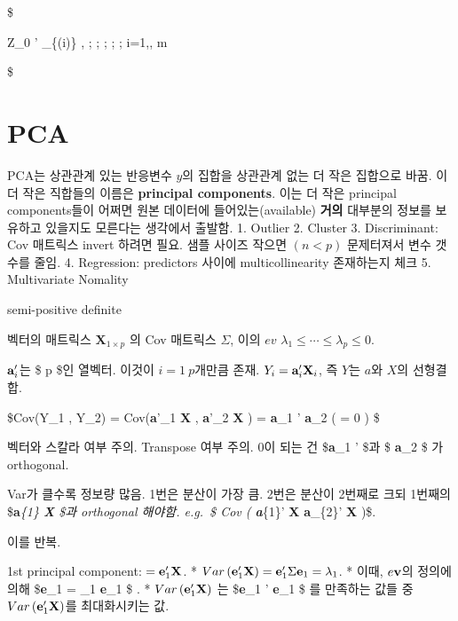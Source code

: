 \documentclass[
]{book}
\begin{document}
{{\$

\pmb Z\_0 ' \pmb \beta\_\{(i)\} \pm {} , ; ; ; ; ; i=1,\cdots, m

\$

\hypertarget{pca}{%
\section{PCA}\label{pca}}

PCA는 상관관계 있는 반응변수 \(y\)의 집합을 상관관계 없는 더 작은 집합으로 바꿈. 이 더 작은 직합들의 이름은 \textbf{principal components}. 이는 더 작은 principal components들이 어쩌면 원본 데이터에 들어있는(available) \textbf{거의} 대부분의 정보를 보유하고 있을지도 모른다는 생각에서 출발함.
1. Outlier
2. Cluster
3. Discriminant: Cov 매트릭스 invert 하려면 필요. 샘플 사이즈 작으면 \((n<p)\) 문제터져서 변수 갯수를 줄임.
4. Regression: predictors 사이에 multicollinearity 존재하는지 체크
5. Multivariate Nomality

semi-positive definite

벡터의 매트릭스 \(\textbf {X}_{1 \times p}\) 의 Cov 매트릭스 \(\Sigma\), 이의 \(ev\) \(\lambda_1 \le \cdots \le \lambda_p \le 0\).

\(\textbf a'_i\)는 \$ p \$인 열벡터. 이것이 \(i=1~p\)개만큼 존재. \(Y_i = \textbf a'_i \textbf {X}_{i}\), 즉 \(Y\)는 \(a\)와 \(X\)의 선형결합.

\$Cov(Y\_1 , Y\_2) = Cov(\textbf a'\_1 \textbf X , \textbf a'\_2 \textbf X ) = \textbf a\_1 ' \Sigma \textbf a\_2 \left( = 0 \right) \$

벡터와 스칼라 여부 주의. Transpose 여부 주의. 0이 되는 건 \$\textbf a\_1 ' \$과 \$ \textbf a\_2 \$ 가 orthogonal.

Var가 클수록 정보량 많음. 1번은 분산이 가장 큼. 2번은 분산이 2번째로 크되 1번째의 \$\textbf {a}\emph{\{1\} \textbf X \$과 orthogonal 해야함. e.g.~\$ Cov \left( \textbf {a}}\{1\}' \textbf X \textbf {a}\_\{2\}' \textbf X \right)\$.

이를 반복.

1st principal component: \(= \textbf e_1 ' \textbf X\).
* \(Var \left( \textbf e_1 ' \textbf X \right)= \textbf e_1 ' \Sigma \textbf e_1 = \lambda_1\).
* 이때, \(e \textbf v\)의 정의에 의해 \$\Sigma \textbf e\_1 = \lambda\_1 \textbf e\_1 \$ .
* \(Var \left( \textbf e_1 ' \textbf X \right)\) 는 \$\textbf e\_1 ' \textbf e\_1 \$ 를 만족하는 값들 중 \(Var \left( \textbf e_1 ' \textbf X \right)\)를 최대화시키는 값.

}}
\end{document}
